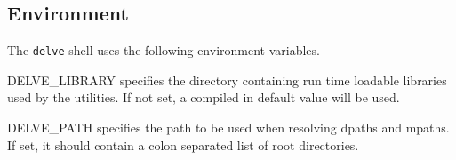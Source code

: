 \documentclass{article}
\begin{document}
\subsection{Environment}
The \texttt{delve} shell uses the following environment variables.
\begin{options}
\item[DELVE\_LIBRARY]
    specifies the directory containing run time loadable libraries
    used by the utilities.  If not set, a compiled in default value
    will be used.  
\item[DELVE\_PATH]
    specifies the path to be used when resolving dpaths and mpaths.
    If set, it should contain a colon separated list of \delve{}
    root directories.
\end{options}
\end{document}
